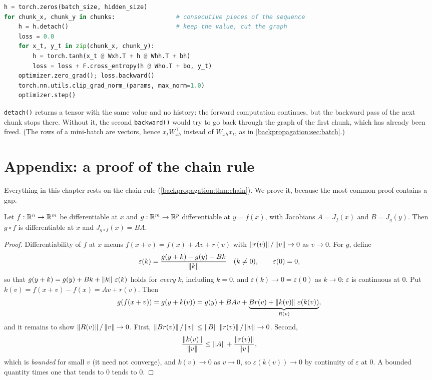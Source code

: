 \begin{notechapter}
\begin{lstlisting}[language=Python]
h = torch.zeros(batch_size, hidden_size)
for chunk_x, chunk_y in chunks:                 # consecutive pieces of the sequence
    h = h.detach()                              # keep the value, cut the graph
    loss = 0.0
    for x_t, y_t in zip(chunk_x, chunk_y):
        h = torch.tanh(x_t @ Wxh.T + h @ Whh.T + bh)
        loss = loss + F.cross_entropy(h @ Who.T + bo, y_t)
    optimizer.zero_grad(); loss.backward()
    torch.nn.utils.clip_grad_norm_(params, max_norm=1.0)
    optimizer.step()
\end{lstlisting}
\texttt{detach()} returns a tensor with the same value and no history: the forward
computation continues, but the backward pass of the next chunk stops there. Without it, the
second \texttt{backward()} would try to go back through the graph of the first chunk, which
has already been freed. (The rows of a mini-batch are vectors, hence $x_tW_{xh}^\top$ instead of
$W_{xh}x_t$, as in \cref{backpropagation:sec:batch}.)

\section{Appendix: a proof of the chain rule}\label{rnn-bptt:sec:chain-proof}

Everything in this chapter rests on the chain rule (\cref{backpropagation:thm:chain}). We
prove it, because the most common proof contains a gap.

\begin{theorem}\label{rnn-bptt:thm:chain}
Let $f:\mathbb{R}^n\to\mathbb{R}^m$ be differentiable at $x$ and $g:\mathbb{R}^m\to\mathbb{R}^p$ differentiable at $y = f(x)$, with Jacobians $A = J_f(x)$
and $B = J_g(y)$. Then $g\circ f$ is differentiable at $x$ and $J_{g\circ f}(x) = BA$.
\end{theorem}

\begin{proof}
Differentiability of $f$ at $x$ means $f(x + v) = f(x) + Av + r(v)$ with $\left\|r(v)\right\|/\left\|v\right\|\to0$ as $v\to0$. For $g$, define
\[
  \varepsilon(k) = \frac{g(y + k) - g(y) - Bk}{\left\|k\right\|}\quad(k\neq0),\qquad\varepsilon(0) = 0,
\]
so that $g(y + k) = g(y) + Bk + \left\|k\right\|\,\varepsilon(k)$ holds for \emph{every} $k$, including $k = 0$, and $\varepsilon(k)\to0 = \varepsilon(0)$
as $k\to0$: $\varepsilon$ is continuous at $0$. Put $k(v) = f(x + v) - f(x) = Av + r(v)$. Then
\[
  g(f(x + v)) = g(y + k(v)) = g(y) + BAv + \underbrace{Br(v) + \left\|k(v)\right\|\,\varepsilon(k(v))}_{R(v)} ,
\]
and it remains to show $\left\|R(v)\right\|/\left\|v\right\|\to0$. First, $\left\|Br(v)\right\|/\left\|v\right\|\leq\left\|B\right\|\,\left\|r(v)\right\|/\left\|v\right\|\to0$. Second,
\[
  \frac{\left\|k(v)\right\|}{\left\|v\right\|}\leq\left\|A\right\| + \frac{\left\|r(v)\right\|}{\left\|v\right\|},
\]
which is \emph{bounded} for small $v$ (it need not converge), and $k(v)\to0$ as $v\to0$, so $\varepsilon(k(v))\to0$ by
continuity of $\varepsilon$ at $0$. A bounded quantity times one that tends to $0$ tends to $0$.
\end{proof}


\end{notechapter}

